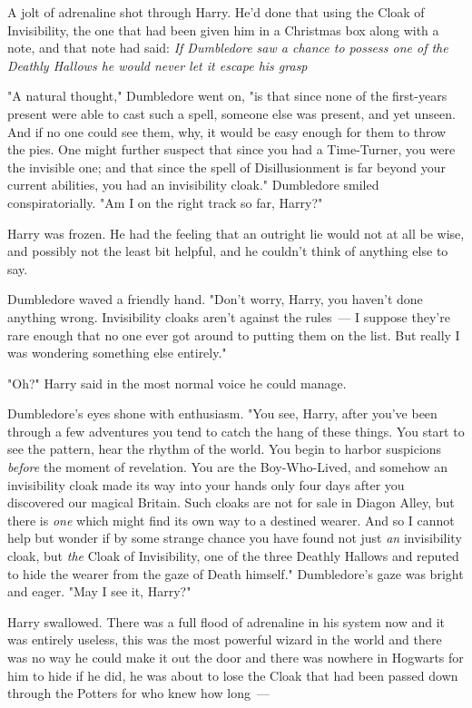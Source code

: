 A jolt of adrenaline shot through Harry. He'd done that using the Cloak of
Invisibility, the one that had been given him in a Christmas box along with a
note, and that note had said: \emph{If Dumbledore saw a chance to possess one
of the Deathly Hallows he would never let it escape his grasp\el}

"A natural thought," Dumbledore went on, "is that since none of the first-years
present were able to cast such a spell, someone else was present, and yet
unseen. And if no one could see them, why, it would be easy enough for them to
throw the pies. One might further suspect that since you had a Time-Turner, you
were the invisible one; and that since the spell of Disillusionment is far
beyond your current abilities, you had an invisibility cloak." Dumbledore
smiled conspiratorially. "Am I on the right track so far, Harry?"

Harry was frozen. He had the feeling that an outright lie would not at all be
wise, and possibly not the least bit helpful, and he couldn't think of anything
else to say.

Dumbledore waved a friendly hand. "Don't worry, Harry, you haven't done
anything wrong. Invisibility cloaks aren't against the rules~--- I suppose
they're rare enough that no one ever got around to putting them on the list.
But really I was wondering something else entirely."

"Oh?" Harry said in the most normal voice he could manage.

Dumbledore's eyes shone with enthusiasm. "You see, Harry, after you've been
through a few adventures you tend to catch the hang of these things. You start
to see the pattern, hear the rhythm of the world. You begin to harbor
suspicions \emph{before} the moment of revelation. You are the Boy-Who-Lived,
and somehow an invisibility cloak made its way into your hands only four days
after you discovered our magical Britain. Such cloaks are not for sale in
Diagon Alley, but there is \emph{one} which might find its own way to a
destined wearer. And so I cannot help but wonder if by some strange chance you
have found not just \emph{an} invisibility cloak, but \emph{the} Cloak of
Invisibility, one of the three Deathly Hallows and reputed to hide the wearer
from the gaze of Death himself." Dumbledore's gaze was bright and eager. "May I
see it, Harry?"

Harry swallowed. There was a full flood of adrenaline in his system now and it
was entirely useless, this was the most powerful wizard in the world and there
was no way he could make it out the door and there was nowhere in Hogwarts for
him to hide if he did, he was about to lose the Cloak that had been passed down
through the Potters for who knew how long~---

